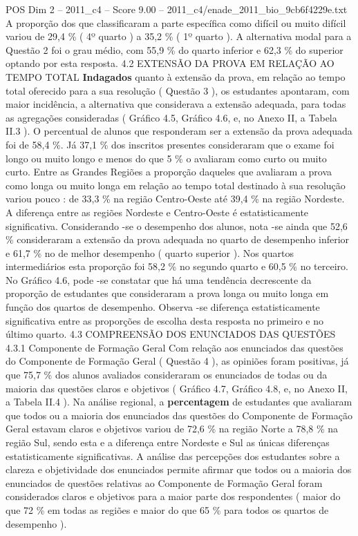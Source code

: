 \begin{textsample}{POS Dim 2 – 2011\_c4 – Score 9.00 – 2011\_c4/enade\_2011\_bio\_9cb6f4229e.txt}
A proporção dos que classificaram a parte específica como difícil ou muito difícil variou de 29,4 \% ( 4º quarto ) a 35,2 \% ( 1º quarto ).
A alternativa modal para a Questão 2 foi o grau médio, com 55,9 \% do quarto inferior e 62,3 \% do superior optando por esta resposta. 4.2 EXTENSÃO DA PROVA EM RELAÇÃO AO TEMPO TOTAL \textbf{Indagados} quanto à extensão da prova, em relação ao tempo total oferecido para a sua resolução ( Questão 3 ), os estudantes apontaram, com maior incidência, a alternativa que considerava a extensão adequada, para todas as agregações consideradas ( Gráfico 4.5, Gráfico 4.6, e, no Anexo II, a Tabela II.3 ).
O percentual de alunos que responderam ser a extensão da prova adequada foi de 58,4 \%.
Já 37,1 \% dos inscritos presentes consideraram que o exame foi longo ou muito longo e menos do que 5 \% o avaliaram como curto ou muito curto.
Entre as Grandes Regiões a proporção daqueles que avaliaram a prova como longa ou muito longa em relação ao tempo total destinado à sua resolução variou pouco : de 33,3 \% na região Centro-Oeste até 39,4 \% na região Nordeste.
A diferença entre as regiões Nordeste e Centro-Oeste é estatisticamente significativa.
Considerando -se o desempenho dos alunos, nota -se ainda que 52,6 \% consideraram a extensão da prova adequada no quarto de desempenho inferior e 61,7 \% no de melhor desempenho ( quarto superior ).
Nos quartos intermediários esta proporção foi 58,2 \% no segundo quarto e 60,5 \% no terceiro.
No Gráfico 4.6, pode -se constatar que há uma tendência decrescente da proporção de estudantes que consideraram a prova longa ou muito longa em função dos quartos de desempenho.
Observa -se diferença estatisticamente significativa entre as proporções de escolha desta resposta no primeiro e no último quarto. 4.3 COMPREENSÃO DOS ENUNCIADOS DAS QUESTÕES 4.3.1 Componente de Formação Geral Com relação aos enunciados das questões do Componente de Formação Geral ( Questão 4 ), as opiniões foram positivas, já que 75,7 \% dos alunos avaliados consideraram os enunciados de todas ou da maioria das questões claros e objetivos ( Gráfico 4.7, Gráfico 4.8, e, no Anexo II, a Tabela II.4 ).
Na análise regional, a \textbf{percentagem} de estudantes que avaliaram que todos ou a maioria dos enunciados das questões do Componente de Formação Geral estavam claros e objetivos variou de 72,6 \% na região Norte a 78,8 \% na região Sul, sendo esta e a diferença entre Nordeste e Sul as únicas diferenças estatisticamente significativas.
A análise das percepções dos estudantes sobre a clareza e objetividade dos enunciados permite afirmar que todos ou a maioria dos enunciados de questões relativas ao Componente de Formação Geral foram considerados claros e objetivos para a maior parte dos respondentes ( maior do que 72 \% em todas as regiões e maior do que 65 \% para todos os quartos de desempenho ).

\end{textsample}
